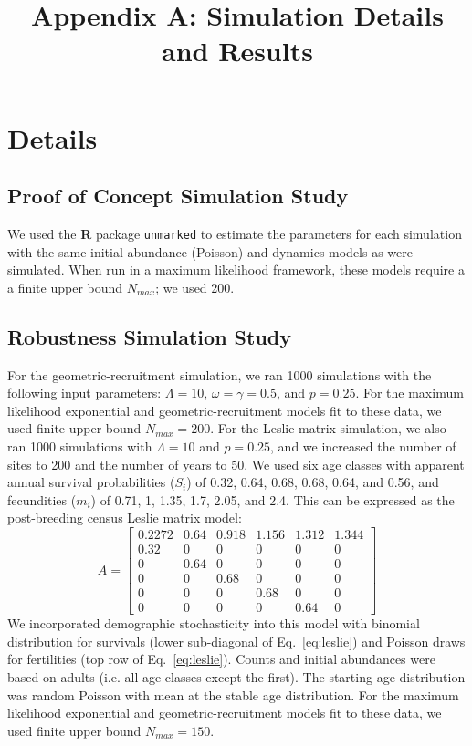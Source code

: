 \documentclass{article}
\begin{document}
\title{Appendix A: Simulation Details and Results}
\date{} 
\maketitle
\renewcommand*\thetable{A\arabic{table}}
\renewcommand*\thefigure{A\arabic{figure}}
\renewcommand*\theequation{A\arabic{equation}}

\section*{Details}
\subsection*{Proof of Concept Simulation Study}

We used the \textbf{R} package \texttt{unmarked} to estimate the parameters 
for each simulation with the same
initial abundance (Poisson) and dynamics models as were simulated.
When run in a maximum likelihood framework, these models require a
a finite upper bound $N_{max}$; we used 200.  

\subsection*{Robustness Simulation Study}
For the geometric-recruitment simulation, we ran 1000 simulations with the following input 
parameters: $\Lambda = 10$, $\omega = \gamma = 0.5$, and $p = 0.25$.  
For the maximum likelihood exponential and geometric-recruitment models fit to these data, 
we used finite upper bound $N_{max} = 200$. 
For the Leslie matrix simulation, we also ran 1000 simulations with $\Lambda = 10$ and $p = 0.25$,
and we increased the number of sites to 200 and the number of years to 50.  We used
six age classes with apparent annual survival probabilities ($S_{i}$) of 0.32, 0.64, 0.68, 0.68, 0.64, and 0.56,
and fecundities ($m_{i}$) of 0.71, 1, 1.35, 1.7, 2.05, and 2.4.  This can be expressed as the post-breeding
census Leslie matrix model:
\begin{equation}
A = \begin{bmatrix} 0.2272 & 0.64 & 0.918 & 1.156 & 1.312 & 1.344 \\ 
0.32 & 0 & 0 & 0 & 0 & 0 \\
0 & 0.64 & 0 & 0 & 0 & 0 \\
0 & 0 & 0.68 & 0 & 0 & 0 \\
0 & 0 & 0 & 0.68 & 0 & 0 \\
0 & 0 & 0 & 0 & 0.64 & 0 \end{bmatrix}
\label{eq:leslie}
\end{equation}
We incorporated demographic stochasticity into this model with binomial distribution for survivals
(lower sub-diagonal of Eq.~\ref{eq:leslie}) and Poisson draws for fertilities (top row of 
Eq.~\ref{eq:leslie}).  Counts and initial abundances were based on adults (i.e. all age classes except
the first).  The starting age distribution was random Poisson with mean at the stable age distribution.
For the maximum likelihood exponential and geometric-recruitment models fit to these data, 
we used finite upper bound $N_{max} = 150$. 
\end{document}
